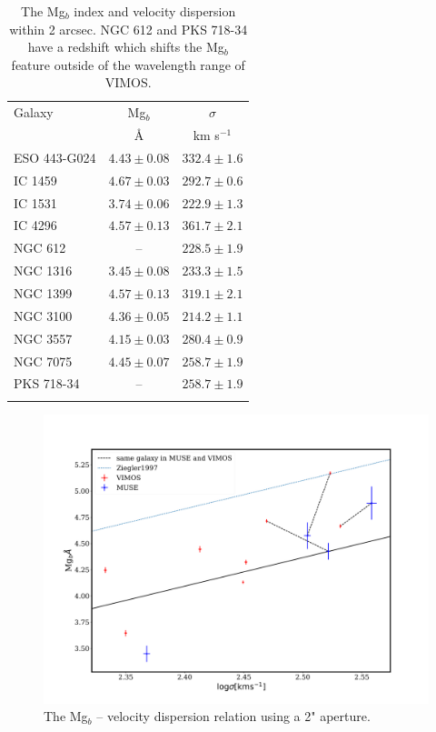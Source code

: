 {{{{			\begin{table}
				\centering
				\caption{The Mg$_b$ index and velocity dispersion within 2 arcsec. NGC 612 and PKS 718-34 have a redshift which shifts the Mg$_b$ feature outside of the wavelength range of VIMOS.}
				\label{tab:globalMg}
				\begin{tabular}{l c c}
					\hline
					\hline
					Galaxy 	& Mg$_b$ & $\sigma$ \\
							& \AA 	& km s$^{-1}$ \\
					\hline
					ESO 443-G024 & $4.43 \pm 0.08$ & $332.4 \pm 1.6$ \\
					IC 1459 	& $4.67 \pm 0.03$ & $292.7 \pm 0.6$ \\
					IC 1531 	& $3.74 \pm 0.06$ & $222.9 \pm 1.3$ \\
					IC 4296		& $4.57 \pm 0.13$ & $361.7 \pm 2.1$ \\
					NGC 612 	& --   			  & $228.5 \pm 1.9$ \\
					NGC 1316 	& $3.45 \pm 0.08$ & $233.3 \pm 1.5$ \\
					NGC 1399 	& $4.57 \pm 0.13$ & $319.1 \pm 2.1$ \\
					NGC 3100 	& $4.36 \pm 0.05$ & $214.2 \pm 1.1$ \\
					NGC 3557 	& $4.15 \pm 0.03$ & $280.4 \pm 0.9$ \\
					NGC 7075 	& $4.45 \pm 0.07$ & $258.7 \pm 1.9$ \\
					PKS 718-34  & -- 		      & $258.7 \pm 1.9$ \\
					\hline \\
				\end{tabular}
			\end{table}

			\begin{figure}
				\centering
				\includegraphics[width=.8\textwidth]{chapter4/Mg_sigma.png}
				\caption[Global Mg$_b$--\textsigma]{The Mg$_b$ -- velocity dispersion relation using a 2" aperture.}
				\label{fig:globalMg}
			\end{figure}

}}}}
